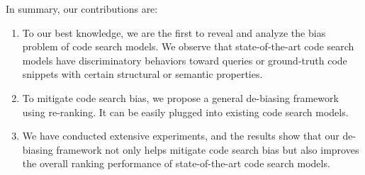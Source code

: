 
In summary, our contributions are:
\begin{enumerate} 

\item To our best knowledge, we are the first to reveal and analyze the bias problem of code search models. We observe that state-of-the-art code search models have discriminatory behaviors toward queries or ground-truth code snippets with certain structural or semantic properties.

\item To mitigate code search bias, we propose a general de-biasing framework using re-ranking. It can be easily plugged into existing code search models.

\item We have conducted extensive experiments, and the results show that our de-biasing framework not only helps mitigate code search bias but also improves the overall ranking performance of state-of-the-art code search models.

\end{enumerate} 



